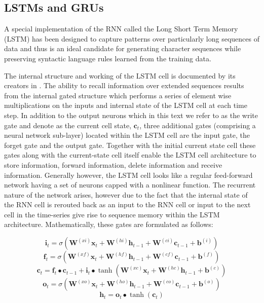 \subsection{LSTMs and GRUs}

A special implementation of the RNN called the Long Short Term Memory (LSTM) has been designed to capture patterns over particularly long sequences of data and thus is an ideal candidate for generating character sequences while preserving syntactic language rules learned from the training data.

The internal structure and working  of the LSTM cell is documented by its creators in \cite{sak2014long}. The ability to recall information over extended sequences results from the internal gated structure which performs a series of element wise multiplications on the inputs and internal state of the LSTM cell at each time step.  In addition to the output neurons which in this text we refer to as the write gate and denote as the current cell state, $\mathbf{c}_t$, three additional gates (comprising a neural network sub-layer) located within the LSTM cell are the input gate, the forget gate and the output gate.  Together with the initial current state cell these gates along with the current-state cell itself enable the LSTM cell architecture to store information, forward information, delete information and receive information.  Generally however, the LSTM cell looks like a regular feed-forward network having a set of neurons capped with a nonlinear function.  The recurrent nature of the network arises, however due to the fact that the internal state of the RNN cell is rerouted back as an input to the RNN cell or input to the next cell in the time-series give rise to sequence memory within the LSTM architecture. Mathematically, these gates are formulated as follows:

\begin{equation}
\mathbf{i}_t=\sigma(\mathbf{W}^{(xi)}\mathbf{x}_t+\mathbf{W}^{(hi)}\mathbf{h}_{t-1}+\mathbf{W}^{(ci)}\mathbf{c}_{t-1}+\mathbf{b}^{(i)})
\label{eqn_c3_lstm01}
\end{equation}
\begin{equation}
\mathbf{f}_t=\sigma(\mathbf{W}^{(xf)}\mathbf{x}_t+\mathbf{W}^{(hf)}\mathbf{h}_{t-1}+\mathbf{W}^{(cf)}\mathbf{c}_{t-1}+\mathbf{b}^{(f)})
\label{eqn_c3_lstm02}
\end{equation}
\begin{equation}
\mathbf{c}_t=\mathbf{f}_t\bullet\mathbf{c}_{t- 1}+\mathbf{i}_t\bullet\tanh(\mathbf{W}^{(xc)}\mathbf{x}_t+\mathbf{W}^{(hc)}\mathbf{h}_{t-1}+\mathbf{b}^{(c)})\label{eqn_c3_lstm03}
\end{equation}
\begin{equation}
\mathbf{o}_t=\sigma(\mathbf{W}^{(xo)}\mathbf{x}_t+\mathbf{W}^{(ho)}\mathbf{h}_{t-1}+\mathbf{W}^{(co)}\mathbf{c}_{t-1}+\mathbf{b}^{(o)})\label{eqn_c3_lstm04}\end{equation}
\begin{equation}
\mathbf{h}_t=\mathbf{o}_t\bullet\tanh{(\mathbf{c}_t)}
\label{eqn_c3_lstm05}
\end{equation}


